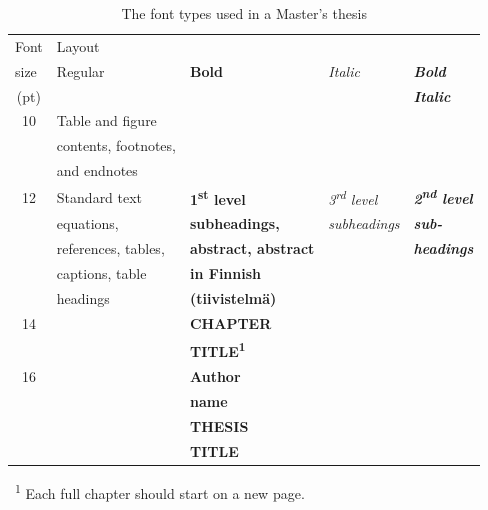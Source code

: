 \DIFdelbegin %
\DIFdelend \begin{table}[!ht]
  \def\arraystretch{1.1}%
  \begin{center}
    \caption{The font types used in a Master’s thesis}
    \label{tab:sample_table}
    \begin{tabular}{| c | l | l | l | l |}
      \hline
      \multicolumn{1}{|l|}{Font}  & \multicolumn{4}{l|}{Layout}
      \\\cline{2-5} \multicolumn{1}{|l|}{size} & Regular &
      \textbf{Bold} & \textit{Italic} & \textbf{\textit{Bold}} \\(pt)
      &  &  &  & \textbf{\textit{Italic}}\\
      \hline
      10 &  {\fontsize{10}{12pt}\selectfont Table and figure} &  &  &  \\
      &  {\fontsize{10}{12pt}\selectfont contents, footnotes,} &  &  &  \\
      &  {\fontsize{10}{12pt}\selectfont and endnotes} &  &  &  \\
      \hline
      12 & Standard text &  \textbf{1\textsuperscript{st} level} &
      \textit{3\textsuperscript{rd} level} &
      \textbf{\textit{2\textsuperscript{nd} level}}\\
      &  equations, &  \textbf{subheadings,} &  \textit{subheadings}
      &  \textbf{\textit{sub-}} \\
      & references, tables, & \textbf{abstract, abstract} &  &
      \textbf{\textit{headings}} \\
      & captions, table & \textbf{in Finnish} &  &  \\
      & headings & \textbf{(tiivistelmä)} &  &  \\
      \hline
      \rule{0pt}{0.8\normalbaselineskip}
      14 &  & {\fontsize{14}{17pt}\selectfont \textbf{CHAPTER}} &  &  \\
      &  & {\fontsize{14}{17pt}\selectfont
      \textbf{TITLE\textsuperscript{1}}} &  &  \\
      \hline
      \rule{0pt}{1.0\normalbaselineskip}
      16 &  & {\fontsize{16}{19pt}\selectfont \textbf{Author}} &  &  \\
      &  & {\fontsize{16}{19pt}\selectfont \textbf{name}} &  &  \\
      \hline
      \rule{0pt}{1.1\normalbaselineskip}
      {\fontsize{16}{19pt}\selectfont 18} &  &
      {\fontsize{18}{22pt}\selectfont \textbf{THESIS}} &  &  \\
      &  & {\fontsize{18}{22pt}\selectfont \textbf{TITLE}} &  &  \\
      \hline
    \end{tabular}
    \vspace{6pt}

  \raggedright \ \space \textsuperscript{1\DIFdelbeginFL \DIFdelFL{)}\DIFdelendFL } Each full chapter should
  start on a new page.
\end{center}
\end{table}

